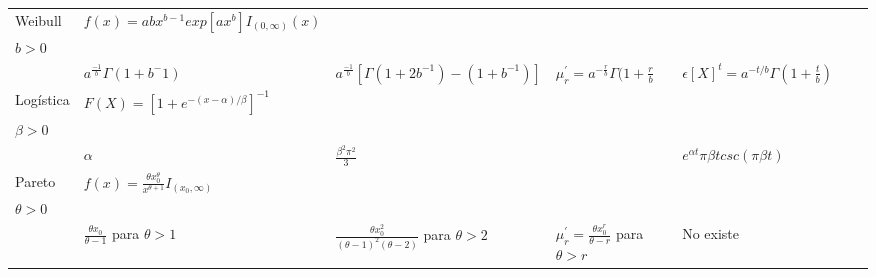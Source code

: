 \begin{table}[ht!]
\begin{tabular}{|p{1.5cm}|p{5.12cm}|p{2.13cm}|p{1.8cm}|p{2.13cm}|p{4cm}|p{2cm}|}
        Weibull &
        $f(x) = abx^{b-1}exp[ax^b]I_{(0,\infty)}(x)$ &
        \Longunderstack{
        $a>0$ \\ $b>0$ \\
        } &
        \tiny
        $a^{\frac{-1}{b}}\Gamma(1+b^-1)$ &
        \tiny
        $a^{\frac{-1}{b}}[\Gamma(1+2b^{-1})-(1+b^{-1})]$ &
        \normalsize 
        $\mu_r^{'} = a^{-\frac{r}{b}}\Gamma(1+\frac{r}{b}$&
        \tiny
        $\epsilon[X]^t = a^{-t/b}\Gamma(1+\frac{t}{b})$
        \normalsize 
        \\ \hline
        
        Logística &
        $F(X) = [1+e^{-(x-\alpha)/\beta}]^{-1}$ &
        \Longunderstack{
        $-\infty < \alpha < \infty $ \\ $\beta > 0$
        \\} &
        $\alpha$ &
        $\frac{\beta^2\pi^2}{3}$ &
        
        &
        \small
        $e^{\alpha t}\pi\beta t csc(\pi\beta t)$
        \normalsize 
        \\ \hline
        
        Pareto  &
        $f(x) = \frac{\theta  x_0^\theta}{x^{\theta+1}}I_{(x_0,\infty)}$  &
        \Longunderstack{
        $x_0 > 0$ \\ $\theta > 0$
        \\} &
        $\frac{\theta x_0}{\theta-1}$ para $\theta > 1$ &
        $\frac{\theta x_0^2}{(\theta-1)^2(\theta-2)}$ para $\theta > 2$ &
        $\mu_r^{'} = \frac{\theta x_0^r}{\theta-r}$ para $\theta > r$ &
        No existe
        \\ \hline
        
      \end{tabular}
\end{table}    

